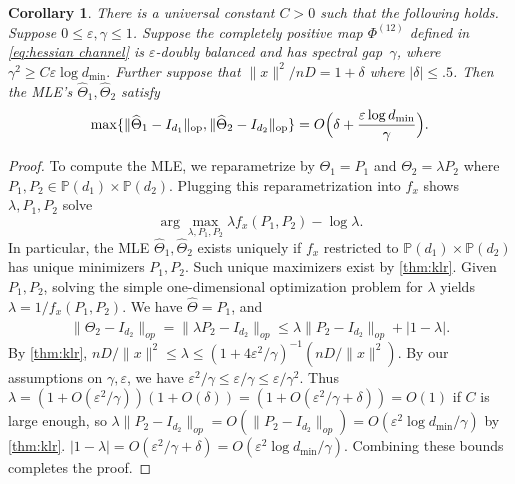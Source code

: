 \documentclass[aos]{imsart}
\newtheorem{corollary}[theorem]{Corollary}
\theoremstyle{definition}
\numberwithin{equation}{section}
\DeclareMathOperator{\op}{op}
\DeclarePairedDelimiter{\norm}{\lVert}{\rVert}
\newcommand{\htheta}{\widehat{\Theta}}
\newcommand{\ot}{\otimes}
\newcommand{\eps}{\varepsilon}
\newcommand{\SPD}{\mathbb{P}}
\newcommand{\CF}[1]{{\color{purple}[CF: #1]}}
\begin{document}
\begin{corollary}\label{cor:klr}
There is a universal constant $C>0$ such that the following holds. Suppose 
$0 \leq \eps, \gamma \leq 1$. Suppose the completely positive map $\Phi^{(12)}$ defined in \cref{eq:hessian channel} is $\eps$-doubly balanced and has spectral gap~$\gamma$, where $\gamma^2 \geq C \eps \log d_{\min}.$ Further suppose that $\|x\|^2/nD = 1 + \delta$ where $|\delta| \leq .5$.  Then the MLE's $\htheta_1, \htheta_2$ satisfy
\begin{align*}
  \max \{ \norm{\htheta_1 - I_{d_1}}_{\op}, \norm{\htheta_2 - I_{d_2}}_{\op} \} = O\Bigl(\delta + \frac{\eps \log d_{\min}}\gamma\Bigr).
\end{align*}
\end{corollary}
\begin{proof}

To compute the MLE, we reparametrize by $\Theta_1 = P_1$ and $\Theta_2 = \lambda P_2$ where $P_1,P_2 \in \SPD(d_1) \times \SPD(d_2)$. Plugging this reparametrization into $f_x$ shows $\lambda, P_1, P_2$ solve
$$\arg\max_{\lambda, P_1, P_2} \lambda f_x(P_1, P_2) - \log \lambda.$$
In particular, the MLE $\htheta_1, \htheta_2$ exists uniquely if $f_x$ restricted to $\SPD(d_1) \times \SPD(d_2)$ has unique minimizers $P_1, P_2$. Such unique maximizers exist by \cref{thm:klr}. Given $P_1, P_2$, solving the simple one-dimensional optimization problem for $\lambda$ yields $\lambda = 1/f_x(P_1, P_2)$. We have $\htheta = P_1$, and
$$ \|\htheta_2 - I_{d_2} \|_{op} = \|\lambda P_2  - I_{d_2} \|_{op} \leq \lambda \|P_2 - I_{d_2}\|_{op} + |1 - \lambda|.$$
By \cref{thm:klr}, $nD/\|x\|^2  \leq \lambda \leq (1 + 4 \eps^2/\gamma)^{-1} (nD/\|x\|^2).$ By our assumptions on $\gamma, \eps$, we have $\eps^2/\gamma \leq \eps/\gamma \leq \eps/\gamma^2$. Thus $\lambda = (1 + O(\eps^2/\gamma))(1+ O(\delta)) = (1 + O(\eps^2/\gamma +\delta)) = O(1)$ if $C$ is large enough, so $\lambda \|P_2 - I_{d_2}\|_{op} = O(\|P_2 - I_{d_2}\|_{op}) = O(\eps^2 \log d_{\min}/\gamma)$ by \cref{thm:klr}. $|1 - \lambda| = O(\eps^2/\gamma +\delta) = O(\eps^2 \log d_{\min}/\gamma)$. Combining these bounds completes the proof.\end{proof}


\end{document}
